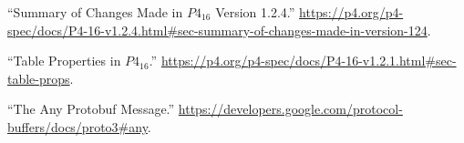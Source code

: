 \documentclass[11pt]{article}
\begin{document}
{{\begin{thebibliography}{44}
\mdbibitemlabel{{}[34]}\textquotedblleft{}Summary of Changes Made in $P4_{16}$ Version 1.2.4.\textquotedblright{} \href{https://p4.org/p4-spec/docs/P4-16-v1.2.4.html\%23sec-summary-of-changes-made-in-version-124}{{\ttfamily https://\hspace{0pt}p4.\hspace{0pt}org/\hspace{0pt}p4-\hspace{0pt}spec/\hspace{0pt}docs/\hspace{0pt}P4-\hspace{0pt}16-\hspace{0pt}v1.\hspace{0pt}2.\hspace{0pt}4.\hspace{0pt}html\#\hspace{0pt}sec-\hspace{0pt}summary-\hspace{0pt}of-\hspace{0pt}changes-\hspace{0pt}made-\hspace{0pt}in-\hspace{0pt}version-\hspace{0pt}124}}.\label{p4revisions124}%

\mdbibitemlabel{{}[35]}\textquotedblleft{}Table Properties in $P4_{16}$.\textquotedblright{} \href{https://p4.org/p4-spec/docs/P4-16-v1.2.1.html\%23sec-table-props}{{\ttfamily https://\hspace{0pt}p4.\hspace{0pt}org/\hspace{0pt}p4-\hspace{0pt}spec/\hspace{0pt}docs/\hspace{0pt}P4-\hspace{0pt}16-\hspace{0pt}v1.\hspace{0pt}2.\hspace{0pt}1.\hspace{0pt}html\#\hspace{0pt}sec-\hspace{0pt}table-\hspace{0pt}props}}.\label{p4tableproperties}%

\mdbibitemlabel{{}[36]}\textquotedblleft{}The Any Protobuf Message.\textquotedblright{} \href{https://developers.google.com/protocol-buffers/docs/proto3\%23any}{{\ttfamily https://\hspace{0pt}developers.\hspace{0pt}google.\hspace{0pt}com/\hspace{0pt}protocol-\hspace{0pt}buffers/\hspace{0pt}docs/\hspace{0pt}proto3\#\hspace{0pt}any}}.\label{protoany}%


\end{thebibliography}}}
\end{document}
